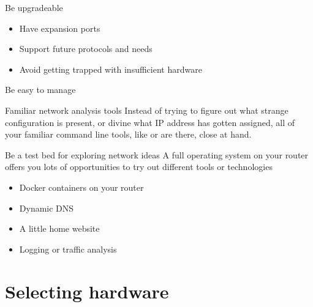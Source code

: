 \documentclass[bigger,aspectratio=169]{beamer}
\begin{document}
\frame{\subsectionpage}

\begin{frame}[label={sec:org8d79961}]{Be upgradeable}
  \begin{itemize}
  \item<2-> Have expansion ports
  \item<3-> Support future protocols and needs
  \item<4-> Avoid getting trapped with insufficient hardware
  \end{itemize}
\end{frame}

\begin{frame}[label={sec:org1c4cf14}]{Be easy to manage}
\begin{block}{Familiar network analysis tools}
Instead of trying to figure out what strange configuration is present, or
divine what IP address has gotten assigned, all of your familiar command
line tools, like or are there, close at
hand.
\end{block}
\end{frame}

\begin{frame}[label={sec:org100ce9b}]{Be a test bed for exploring network ideas}
A full operating system on your router offers you lots of opportunities to
try out different tools or technologies

\begin{itemize}
  \item<2-> Docker containers on your router

  \item<3-> Dynamic DNS
  \item<4-> A little home website
  \item<5-> Logging or traffic analysis
\end{itemize}
\end{frame}

\section{Selecting hardware}
\label{sec:org7a3497d}
\end{document}
